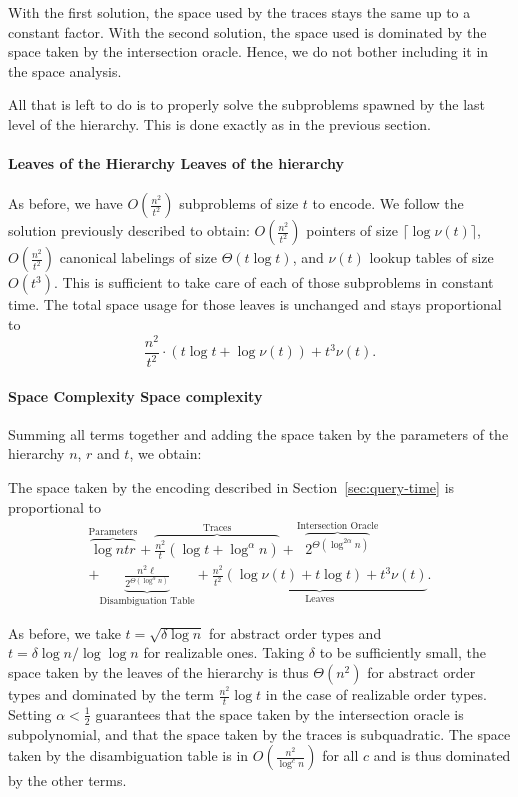 With the first solution, the space used by the traces stays the same up to a
constant factor. With the second solution, the space used is dominated by the
space taken by the intersection oracle. Hence, we do not bother including it in
the space analysis.


All that is left to do is to properly solve the subproblems spawned by the last
level of the hierarchy. This is done exactly as in the previous section.
%
\paragraph*{\iftitlecase%
Leaves of the Hierarchy\else%
Leaves of the hierarchy\fi}
%
As before, we have \(O(\frac{n^2}{t^2})\) subproblems of size \(t\) to encode.
We follow the solution previously described to obtain:
\(O(\frac{n^2}{t^2})\) pointers of size \(\lceil \log{\nu(t)} \rceil\),
\(O(\frac{n^2}{t^2})\) canonical labelings of size \(\Theta(t \log t)\),
and \(\nu(t)\) lookup tables of size \(O(t^3)\).
%
This is sufficient to take care of each of those subproblems in constant time.
The total space usage for those leaves is unchanged and stays proportional to
\begin{displaymath}
  \frac{n^2}{t^2} \cdot (t \log t + \log{\nu(t)}) + t^3 \nu(t).
\end{displaymath}

\paragraph*{\iftitlecase%
Space Complexity\else%
Space complexity\fi}
Summing all terms together and adding the space taken by the
parameters of the hierarchy \(n\), \(r\) and \(t\), we obtain:
\begin{lemma}\label{lem:space-2-all-query}
  The space taken by the encoding described in Section~\ref{sec:query-time} is
  proportional to
    \begin{multline*}
    \overbrace{\log ntr}^{\text{Parameters}}
    +
    \overbrace{\frac{n^2}{t} (\log t + \log^{\alpha} n)}^{\text{Traces}}
    +
    \overbrace{2^{\Theta(\log^{2\alpha} n)}}^{\text{Intersection Oracle}}\\
    +
    \underbrace{\frac{n^2 \ell}{2^{\Theta(\log^{\alpha} n)}}}_{\text{Disambiguation Table}}
    +
    \underbrace{\frac{n^2}{t^2} ( \log \nu(t) + t \log t) + t^3 \nu(t)}_{\text{Leaves}}.
    \end{multline*}
\end{lemma}
As before,
we take \(t = \sqrt{\delta \log n}\) for abstract order types and \(t = \delta
\log n / \log\log n\) for realizable ones.
Taking \(\delta\) to be sufficiently small,
the space taken by the leaves of the hierarchy is thus \(\Theta(n^2)\) for
abstract order types and dominated by the term \(\frac{n^2}{t} \log t\)
in the case of realizable order types.
%
Setting \(\alpha < \frac 12\)
guarantees
that the space taken by the intersection oracle is subpolynomial,
and
that the space taken by the traces is subquadratic.
%
The space taken by the
disambiguation table is in \(O(\frac{n^2}{\log^c n})\) for all \(c\) and is
thus dominated by the other terms.

